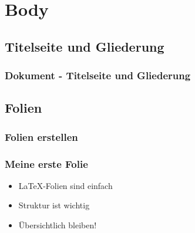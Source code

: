 \documentclass{beamer}
\begin{document}
\section{Body}
\subsection{Titelseite und Gliederung}
\begin{frame}[fragile]
\frametitle{Dokument - Titelseite und Gliederung}
  \begin{semiverbatim}
  \end{semiverbatim}
\end{frame}

\subsection{Folien}
\begin{frame}[fragile]
\frametitle{Folien erstellen}
  \begin{semiverbatim}
  \end{semiverbatim}
\end{frame}

\begin{frame}
\frametitle{Meine erste Folie}
  \begin{itemize}
    \item \LaTeX-Folien sind einfach
    \item Struktur ist wichtig
    \item Übersichtlich bleiben!
  \end{itemize}
\end{frame}
\end{document}
